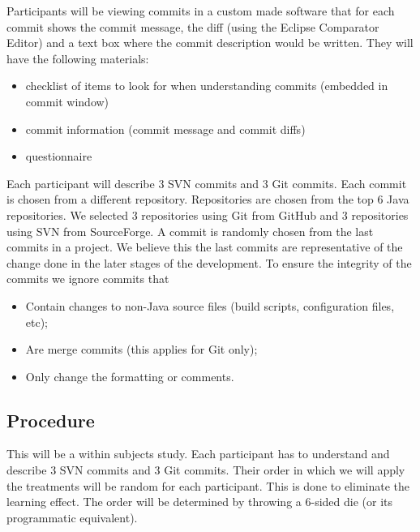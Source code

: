 \documentclass[letterpaper]{article}
\begin{document}
Participants will be viewing commits in a custom made software that for each commit shows the commit message, the diff (using the Eclipse Comparator Editor) and a text box where the commit description would be written.
They will have the following materials:
\begin{itemize}
	\item checklist of items to look for when understanding commits (embedded in commit window)
	\item commit information (commit message and commit diffs)
	\item questionnaire
\end {itemize}

Each participant will describe 3 SVN commits and 3 Git commits.
Each commit is chosen from a different repository.
Repositories are chosen from the top 6 Java repositories.
We selected 3 repositories using Git from GitHub and 3 repositories using SVN from SourceForge.
A commit is randomly chosen from the last commits in a project.
We believe this the last commits are representative of the change done in the later stages of the development.
To ensure the integrity of the commits we ignore commits that 
\begin{itemize}
	\item Contain changes to non-Java source files (build scripts, configuration files, etc);
	\item Are merge commits (this applies for Git only);
	\item Only change the formatting or comments.
\end{itemize}

\subsection{Procedure}

This will be a within subjects study. 
Each participant has to understand and describe 3 SVN commits and 3 Git commits. 
Their order in which we will apply the treatments will be random for each participant. 
This is done to eliminate the learning effect. 
The order will be determined by throwing a 6-sided die (or its programmatic equivalent).
\end{document}

